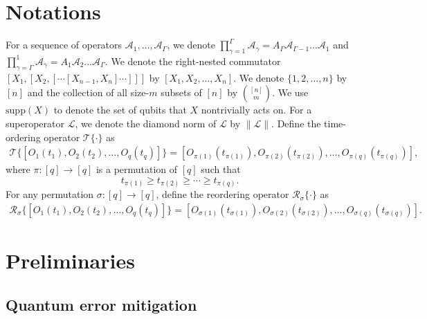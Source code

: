\documentclass[11pt]{article}
\newcommand{\A}{\mathcal{A}}
\newcommand{\supp}{\mathrm{supp}}
\newcommand{\mc}{\mathcal}
\begin{document}
\section{Notations}
For a sequence of operators $\A_1, \ldots, \A_{\Gamma}$, we denote $\prod_{\gamma=1}^\Gamma \A_{\gamma}= A_{\Gamma}\A_{\Gamma-1} \ldots \A_1$ and $\prod_{\gamma=\Gamma}^1 \A_{\gamma}= A_{1}\A_{2} \ldots \A_\Gamma$. We denote the right-nested commutator $[X_1, [X_2, [\cdots[X_{n-1}, X_n]\cdots]]]$ by $[X_1, X_2, \ldots, X_n]$. We denote $\{1, 2, \ldots, n\}$ by $[n]$ and the collection of all size-$m$ subsets of $[n]$ by $\binom{[n]}{m}$. We use $\supp(X)$ to denote the set of qubits that $X$ nontrivially acts on.  For a superoperator $\mc L$, we denote the diamond norm of $\mc L$ by $\|\mc L\|$.
Define the time-ordering operator $\mc T\{\cdot\}$ as \begin{align*}
    \mc T\big\{[O_1(t_1),O_2(t_2),\ldots, O_q(t_q) ]\big\} = [O_{\pi(1)}(t_{\pi(1)}),O_{\pi(2)}(t_{\pi(2)}),\ldots, O_{\pi(q)}(t_{\pi(q)})],
\end{align*}
where $\pi\colon [q]\to[q]$ is a permutation of $[q]$ such that \[
    t_{\pi(1)}\ge t_{\pi(2)}\ge \cdots \ge t_{\pi(q)}.
    \]
For any permutation $\sigma\colon [q]\to [q]$, define the reordering operator $\mc R_{\sigma}\{\cdot\}$ as \begin{align*}
    \mc R_{\sigma}\big\{[O_1(t_1),O_2(t_2),\ldots, O_q(t_q)]\big\} = [O_{\sigma(1)}(t_{\sigma(1)}),O_{\sigma(2)}(t_{\sigma(2)}),\ldots, O_{\sigma(q)}(t_{\sigma(q)})].
\end{align*}

\section{Preliminaries}
\subsection{Quantum error mitigation}
\end{document}
